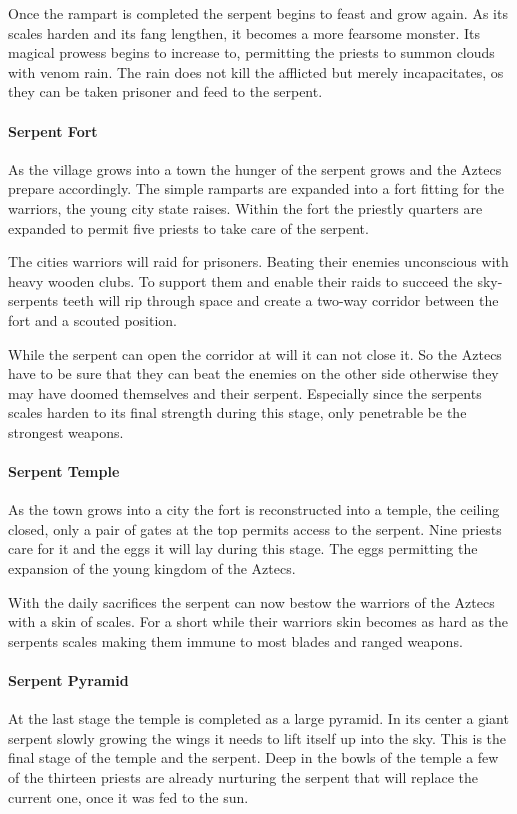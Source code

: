 \documentclass[a4paper]{book}
\begin{document}
				Once the rampart is completed the serpent begins to feast and grow again.
				As its scales harden and its fang lengthen, it becomes a more fearsome monster.
				Its magical prowess begins to increase to,
				permitting the priests to summon clouds with venom rain.
				The rain does not kill the afflicted but merely incapacitates,
				os they can be taken prisoner and feed to the serpent.

			\paragraph{Serpent Fort}
				As the village grows into a town the hunger of the serpent grows and the \gls{Aztecs} 
				prepare accordingly.
				The simple ramparts are expanded into a fort fitting for the warriors,
				the young city state raises.
				Within the fort the priestly quarters are expanded to permit five priests
				to take care of the serpent.

				The cities warriors will raid for prisoners.
				Beating their enemies unconscious with heavy wooden clubs.
				To support them and enable their raids to succeed the sky-serpents
				teeth will rip through space and create a two-way corridor
				between the fort and a scouted position.

				While the serpent can open the corridor at will it can not close it.
				So the \gls{Aztecs} have to be sure that they can beat the enemies on
				the other side otherwise they may have doomed themselves and their serpent.
				Especially since the serpents scales harden to its final strength during this stage,
				only penetrable be the strongest weapons.

			\paragraph{Serpent Temple}
				As the town grows into a city the fort is reconstructed into a temple, the ceiling closed,
				only a pair of gates at the top permits access to the serpent.
				Nine priests care for it and the eggs it will lay during this stage.
				The eggs permitting the expansion of the young kingdom of the \gls{Aztecs}.

				With the daily sacrifices the serpent can now bestow the warriors of the \gls{Aztecs}
				with a skin of scales.
				For a short while their warriors skin becomes as hard as the serpents scales
				making them immune to most blades and ranged weapons.

			\paragraph{Serpent Pyramid}
				At the last stage the temple is completed as a large pyramid.
				In its center a giant serpent slowly growing the wings it needs to lift itself up into the sky.
				This is the final stage of the temple and the serpent.
				Deep in the bowls of the temple a few of the thirteen priests are already nurturing
				the serpent that will replace the current one,
				once it was fed to the sun.
\end{document}
